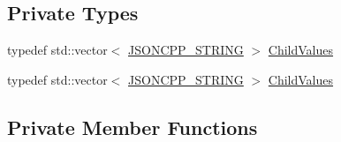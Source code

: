 \subsection*{Private Types}
\begin{DoxyCompactItemize}
\item 
typedef std\+::vector$<$ \hyperlink{config_8h_a1e723f95759de062585bc4a8fd3fa4be}{J\+S\+O\+N\+C\+P\+P\+\_\+\+S\+T\+R\+I\+NG} $>$ \hyperlink{class_json_1_1_styled_stream_writer_a259bf9d99847b2ea64ec9c6dd441944e}{Child\+Values}
\item 
typedef std\+::vector$<$ \hyperlink{config_8h_a1e723f95759de062585bc4a8fd3fa4be}{J\+S\+O\+N\+C\+P\+P\+\_\+\+S\+T\+R\+I\+NG} $>$ \hyperlink{class_json_1_1_styled_stream_writer_a259bf9d99847b2ea64ec9c6dd441944e}{Child\+Values}
\end{DoxyCompactItemize}
\subsection*{Private Member Functions}
